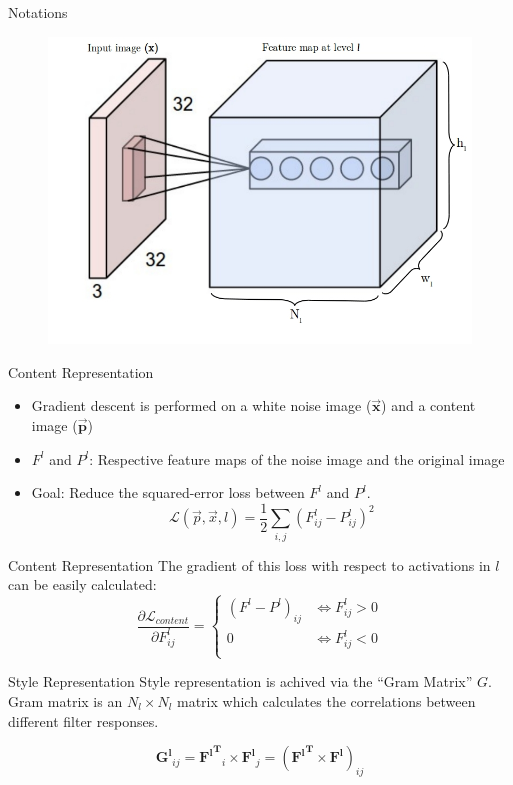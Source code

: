 \documentclass{beamer}
\begin{document}
\begin{frame}{Notations}
    \begin{figure}[H]
        \centering
        \includegraphics[width=.8\textwidth]{levels.jpg}
    \end{figure}
\end{frame}
\begin{frame}{Content Representation}
    \begin{itemize}
        \item Gradient descent is performed on a white noise image
            ($\mathbf{\overrightarrow{x}}$) and a content image
            ($\mathbf{\overrightarrow{p}}$)
        \item $F^l$ and $P^l$: Respective feature maps of the
    noise image and the original image
        \item Goal: Reduce the squared-error loss between $F^l$ and $P^l$.
    \begin{equation}
        \mathcal{L}(\overrightarrow{p}, \overrightarrow{x}, l) =
        \frac{1}{2} \sum_{i,j}{(F^l_{ij} - P^l_{ij})^2}
    \end{equation}
    \end{itemize}
\end{frame}
\begin{frame}{Content Representation}
    The gradient of this loss with respect to activations in $l$ can be easily
    calculated:
    \begin{equation}
        \frac{\partial \mathcal{L}_{content}}{\partial F^l_{ij}}
        =
        \begin{cases}
            (F^l - P^l)_{ij} & \iff F^l_{ij} > 0 \\
            0 & \iff F^l_{ij} < 0 \\
        \end{cases}
    \end{equation}
\end{frame}
\begin{frame}{Style Representation}
Style representation is achived via the ``Gram Matrix'' $G$. Gram matrix is
an $N_l \times N_l$ matrix which calculates the correlations between
different filter responses.

\begin{equation}
    \mathbf{G^l}_{ij} = \mathbf{{F^l}^T}_i \times \mathbf{F^l}_j
    = (\mathbf{{F^l}^T} \times \mathbf{F^l})_{ij}
\end{equation}
\end{frame}
\end{document}
